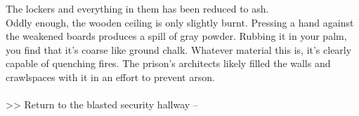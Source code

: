 The lockers and everything in them has been reduced to ash.\\

Oddly enough, the wooden ceiling is only slightly burnt. Pressing a hand against the weakened boards produces a spill of gray powder. Rubbing it in your palm, you find that it's coarse like ground chalk. Whatever material this is, it's clearly capable of quenching fires. The prison's architects likely filled the walls and crawlspaces with it in an effort to prevent arson.\\
\\

>> Return to the blasted security hallway -- 